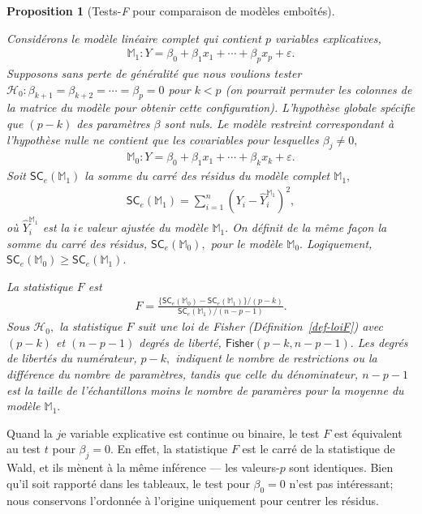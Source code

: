 \documentclass[
  11pt,
  letterpaper,
]{scrbook}
\theoremstyle{plain}
\newtheorem{proposition}{Proposition}[chapter]
\theoremstyle{plain}
\theoremstyle{definition}
\theoremstyle{definition}
\theoremstyle{remark}
\begin{document}
\begin{proposition}[Tests-\emph{F} pour comparaison de modèles
emboîtés]\protect\hypertarget{prp-ftest}{}\label{prp-ftest}

Considérons le modèle linéaire \emph{complet} qui contient \(p\)
variables explicatives, \begin{align*}
\mathbb{M}_1: Y=\beta_0+\beta_1 x_1 + \cdots + \beta_p x_p + \varepsilon.
\end{align*} Supposons sans perte de généralité que nous voulions tester
\(\mathscr{H}_0 : \beta_{k+1}=\beta_{k+2}=\cdots=\beta_p=0\) pour
\(k < p\) (on pourrait permuter les colonnes de la matrice du modèle
pour obtenir cette configuration). L'hypothèse globale spécifie que
\((p-k)\) des paramètres \(\beta\) sont nuls. Le \emph{modèle restreint}
correspondant à l'hypothèse nulle ne contient que les covariables pour
lesquelles \(\beta_j \neq 0,\) \begin{align*}
\mathbb{M}_0: Y=\beta_0+\beta_1 x_1 + \cdots + \beta_k x_k + \varepsilon.
\end{align*} Soit \(\mathsf{SC}_e(\mathbb{M}_1)\) la somme du carré des
résidus du modèle complet \(\mathbb{M}_1,\) \begin{align*}
\mathsf{SC}_e(\mathbb{M}_1)=\sum_{i=1}^n (Y_i-\widehat{Y}_i^{\mathbb{M}_1})^2,
\end{align*} où \(\hat{Y}_i^{\mathbb{M}_1}\) est la \(i\)e valeur
ajustée du modèle \(\mathbb{M}_1.\) On définit de la même façon la somme
du carré des résidus, \(\mathsf{SC}_e(\mathbb{M}_0),\) pour le modèle
\(\mathbb{M}_0.\) Logiquement,
\(\mathsf{SC}_e(\mathbb{M}_0) \geq \mathsf{SC}_e(\mathbb{M}_1).\)

La statistique \(F\) est \begin{align*}
F=\frac{\{\mathsf{SC}_e(\mathbb{M}_0)-\mathsf{SC}_e(\mathbb{M}_1)\}/(p-k)}{\mathsf{SC}_e(\mathbb{M}_1)/(n-p-1)}.
\end{align*} Sous \(\mathscr{H}_0,\) la statistique \(F\) suit une loi
de Fisher (Définition~\ref{def-loiF}) avec \((p-k)\) et \((n-p-1)\)
degrés de liberté, \(\mathsf{Fisher}(p-k, n-p-1).\) Les degrés de
libertés du numérateur, \(p-k,\) indiquent le nombre de restrictions ou
la différence du nombre de paramètres, tandis que celle du dénominateur,
\(n-p-1\) est la taille de l'échantillons moins le nombre de paramères
pour la moyenne du modèle \(\mathbb{M}_1.\)

\end{proposition}

Quand la \(j\)e variable explicative est continue ou binaire, le test
\(F\) est équivalent au test \(t\) pour \(\beta_j=0.\) En effet, la
statistique \(F\) est le carré de la statistique de Wald, et ils mènent
à la même inférence --- les valeurs-\(p\) sont identiques. Bien qu'il
soit rapporté dans les tableaux, le test pour \(\beta_0=0\) n'est pas
intéressant; nous conservons l'ordonnée à l'origine uniquement pour
centrer les résidus.
\end{document}
